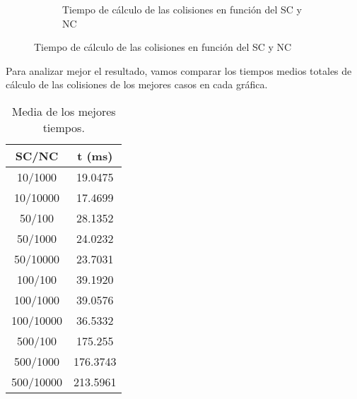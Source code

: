 \documentclass{article}
\begin{document}
\begin{figure}[H]
\begin{subfigure}{0.48\textwidth}
        \caption{Tiempo de cálculo de las colisiones en función del SC y NC}
        \label{fig:hash_D}
    \end{subfigure}
\end{figure}

Para analizar mejor el resultado, vamos comparar los tiempos medios totales de cálculo de las colisiones de los mejores casos en cada gráfica.

\begin{table}[H]
    \centering
    \begin{tabular}{c|c}
        \textbf{SC/NC} & \textbf{t (ms)} \\\toprule
        10/1000        & 19.0475         \\
        10/10000       & 17.4699         \\\midrule
        50/100         & 28.1352         \\
        50/1000        & 24.0232         \\
        50/10000       & 23.7031         \\\midrule
        100/100        & 39.1920         \\
        100/1000       & 39.0576         \\
        100/10000      & 36.5332         \\\midrule
        500/100        & 175.255         \\
        500/1000       & 176.3743        \\
        500/10000      & 213.5961        \\
    \end{tabular}
    \caption{Media de los mejores tiempos.}
    \label{tab:parametros_1}
\end{table}
\end{document}
